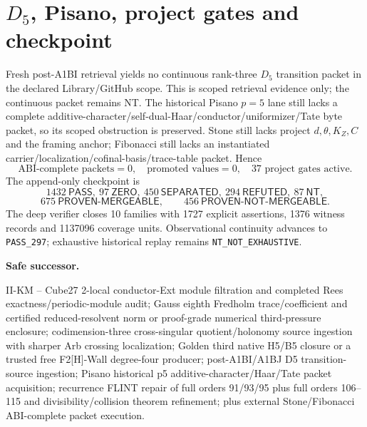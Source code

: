 \documentclass[10pt,a4paper]{article}
\newcommand{\PASS}{\textsf{PASS}}\newcommand{\ZERO}{\textsf{ZERO}}\newcommand{\SEP}{\textsf{SEPARATED}}\newcommand{\REF}{\textsf{REFUTED}}\newcommand{\NT}{\textsf{NT}}
\begin{document}
\section{$D_5$, Pisano, project gates and checkpoint}
Fresh post-A1BI retrieval yields no continuous rank-three $D_5$ transition packet in the declared Library/GitHub scope.  This is scoped retrieval evidence only; the continuous packet remains \NT.  The historical Pisano $p=5$ lane still lacks a complete additive-character/self-dual-Haar/conductor/uniformizer/Tate byte packet, so its scoped obstruction is preserved.  Stone still lacks project $d,\theta,K_Z,C$ and the framing anchor; Fibonacci still lacks an instantiated carrier/localization/cofinal-basis/trace-table packet.  Hence
\[
\boxed{\text{ABI-complete packets}=0,\quad\text{promoted values}=0,\quad37\text{ project gates active}.}
\]
The append-only checkpoint is
\[
\boxed{1432\ \PASS,\ 97\ \ZERO,\ 450\ \SEP,\ 294\ \REF,\ 87\ \NT},
\]
\[
\boxed{675\ \textsf{PROVEN-MERGEABLE},\qquad 456\ \textsf{PROVEN-NOT-MERGEABLE}.}
\]
The deep verifier closes 10 families with 1727 explicit assertions, 1376 witness records and 1137096 coverage units.  Observational continuity advances to \texttt{PASS\_297}; exhaustive historical replay remains \texttt{NT\_NOT\_EXHAUSTIVE}.

\textbf{Safe successor.}\par\begin{minipage}{\linewidth}\scriptsize\ttfamily\sloppy
II-KM -- Cube27 2-local conductor-Ext module filtration and completed Rees exactness/periodic-module audit; Gauss eighth Fredholm trace/coefficient and certified reduced-resolvent norm or proof-grade numerical third-pressure enclosure; codimension-three cross-singular quotient/holonomy source ingestion with sharper Arb crossing localization; Golden third native H5/B5 closure or a trusted free F2[H]-Wall degree-four producer; post-A1BI/A1BJ D5 transition-source ingestion; Pisano historical p5 additive-character/Haar/Tate packet acquisition; recurrence FLINT repair of full orders 91/93/95 plus full orders 106--115 and divisibility/collision theorem refinement; plus external Stone/Fibonacci ABI-complete packet execution.
\end{minipage}
\end{document}
